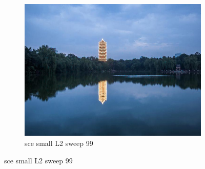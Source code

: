 \documentclass[11pt]{article}
\begin{document}
\begin{figure}[ht!]
\begin{subfigure}[]{0.333\linewidth}
        \centering
        \includegraphics[width=\linewidth]{fig/restoration/sce_small/L2/gibbs_99.jpg}
        \caption{sce small L2 sweep 99}
    \end{subfigure}%
\end{figure}
\end{document}
